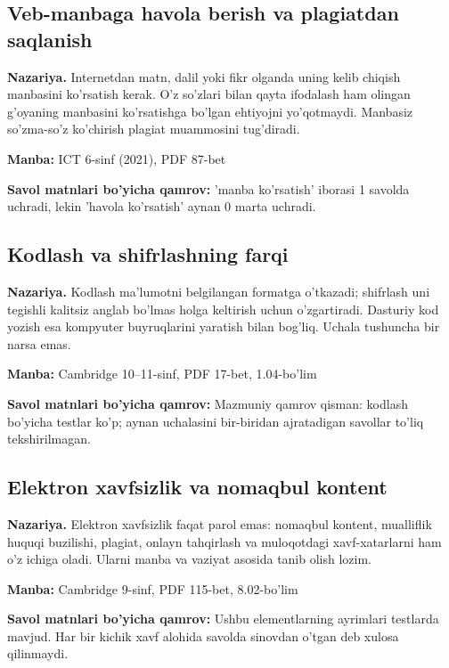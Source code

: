 \documentclass[10pt,a4paper,oneside]{article}
\begin{document}
\subsection{Veb-manbaga havola berish va plagiatdan saqlanish}
\textbf{Nazariya.} Internetdan matn, dalil yoki fikr olganda uning kelib chiqish manbasini ko'rsatish kerak. O'z so'zlari bilan qayta ifodalash ham olingan g'oyaning manbasini ko'rsatishga bo'lgan ehtiyojni yo'qotmaydi. Manbasiz so'zma-so'z ko'chirish plagiat muammosini tug'diradi.
\par\textbf{Manba:} ICT 6-sinf (2021), PDF 87-bet
\par\textbf{Savol matnlari bo'yicha qamrov:} 'manba ko'rsatish' iborasi 1 savolda uchradi, lekin 'havola ko'rsatish' aynan 0 marta uchradi.
\subsection{Kodlash va shifrlashning farqi}
\textbf{Nazariya.} Kodlash ma'lumotni belgilangan formatga o'tkazadi; shifrlash uni tegishli kalitsiz anglab bo'lmas holga keltirish uchun o'zgartiradi. Dasturiy kod yozish esa kompyuter buyruqlarini yaratish bilan bog'liq. Uchala tushuncha bir narsa emas.
\par\textbf{Manba:} Cambridge 10--11-sinf, PDF 17-bet, 1.04-bo'lim
\par\textbf{Savol matnlari bo'yicha qamrov:} Mazmuniy qamrov qisman: kodlash bo'yicha testlar ko'p; aynan uchalasini bir-biridan ajratadigan savollar to'liq tekshirilmagan.
\subsection{Elektron xavfsizlik va nomaqbul kontent}
\textbf{Nazariya.} Elektron xavfsizlik faqat parol emas: nomaqbul kontent, mualliflik huquqi buzilishi, plagiat, onlayn tahqirlash va muloqotdagi xavf-xatarlarni ham o'z ichiga oladi. Ularni manba va vaziyat asosida tanib olish lozim.
\par\textbf{Manba:} Cambridge 9-sinf, PDF 115-bet, 8.02-bo'lim
\par\textbf{Savol matnlari bo'yicha qamrov:} Ushbu elementlarning ayrimlari testlarda mavjud. Har bir kichik xavf alohida savolda sinovdan o'tgan deb xulosa qilinmaydi.
\end{document}
